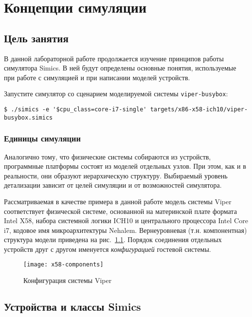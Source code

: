 \chapter{Концепции симуляции}\label{chap:lab02}

\section{Цель занятия}

В данной лабораторной работе продолжается изучение принципов работы симулятора Simics. В ней будут определены основные понятия, используемые при работе с симуляцией и при написании моделей устройств.

Запустите симулятор со сценарием моделируемой системы \texttt{viper-busybox}:

\begin{lstlisting}
$ ./simics -e '$cpu_class=core-i7-single' targets/x86-x58-ich10/viper-busybox.simics
\end{lstlisting}

\subsection{Единицы симуляции} 

Аналогично тому, что физические системы собираются из устройств, программные платформы состоят из моделей отдельных узлов. При этом, как и в реальности, они образуют иерархическую структуру. Выбираемый уровень детализации зависит от целей симуляции и от возможностей симулятора. 

Рассматриваемая в качестве примера в данной работе модель системы Viper соответствует физической системе, основанной на материнской плате формата Intel X58, набора системной логики ICH10 и центрального процессора Intel Core i7, кодовое имя микроархитектуры Nehalem. Вернеуровневая (т.н. компонентная) структура модели приведена на рис.~\ref{fig:x58-components}. Порядок соединения отдельных устройств друг с другом именуется \textit{конфигурацией} гостевой системы.

\begin{figure}[htb]
    \centering
    \texttt{[image: x58-components]}
    \caption{Конфигурация системы Viper}
    \label{fig:x58-components}
\end{figure}


\section{Устройства и классы Simics}

